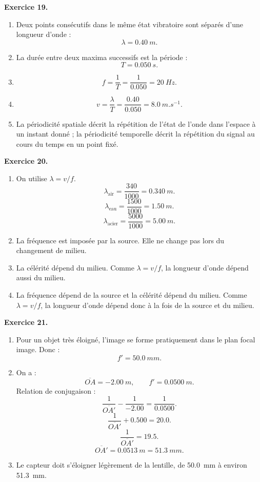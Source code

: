 \documentclass[11pt,a4paper]{article}
\newcommand{\corr}[2]{
  \begin{correctionbox}
  \textbf{Exercice #1.} #2
  \end{correctionbox}
}
\begin{document}
\corr{19}{
\begin{enumerate}
  \item Deux points consécutifs dans le même état vibratoire sont séparés d'une longueur d'onde :
  \[
  \lambda=\SI{0.40}{m}.
  \]
  \item La durée entre deux maxima successifs est la période :
  \[
  T=\SI{0.050}{s}.
  \]
  \item
  \[
  f=\frac{1}{T}=\frac{1}{0.050}=\SI{20}{Hz}.
  \]
  \item
  \[
  v=\frac{\lambda}{T}=\frac{0.40}{0.050}=\SI{8.0}{m.s^{-1}}.
  \]
  \item La périodicité spatiale décrit la répétition de l'état de l'onde dans l'espace à un instant donné ; la périodicité temporelle décrit la répétition du signal au cours du temps en un point fixé.
\end{enumerate}
}

\corr{20}{
\begin{enumerate}
  \item On utilise $\lambda=v/f$.
  \[
  \lambda_{\text{air}}=\frac{340}{1000}=\SI{0.340}{m}.
  \]
  \[
  \lambda_{\text{eau}}=\frac{1500}{1000}=\SI{1.50}{m}.
  \]
  \[
  \lambda_{\text{acier}}=\frac{5000}{1000}=\SI{5.00}{m}.
  \]
  \item La fréquence est imposée par la source. Elle ne change pas lors du changement de milieu.
  \item La célérité dépend du milieu. Comme $\lambda=v/f$, la longueur d'onde dépend aussi du milieu.
  \item La fréquence dépend de la source et la célérité dépend du milieu. Comme $\lambda=v/f$, la longueur d'onde dépend donc à la fois de la source et du milieu.
\end{enumerate}
}

\corr{21}{
\begin{enumerate}
  \item Pour un objet très éloigné, l'image se forme pratiquement dans le plan focal image. Donc :
  \[
  f'=\SI{50.0}{mm}.
  \]
  \item On a :
  \[
  \overline{OA}=-\SI{2.00}{m},\qquad f'=\SI{0.0500}{m}.
  \]
  Relation de conjugaison :
  \[
  \frac{1}{\overline{OA'}}-\frac{1}{-2.00}=\frac{1}{0.0500}.
  \]
  \[
  \frac{1}{\overline{OA'}}+0.500=20.0.
  \]
  \[
  \frac{1}{\overline{OA'}}=19.5.
  \]
  \[
  \overline{OA'}=\SI{0.0513}{m}=\SI{51.3}{mm}.
  \]
  \item Le capteur doit s'éloigner légèrement de la lentille, de \SI{50.0}{mm} à environ \SI{51.3}{mm}.
\end{enumerate}
}
\end{document}
